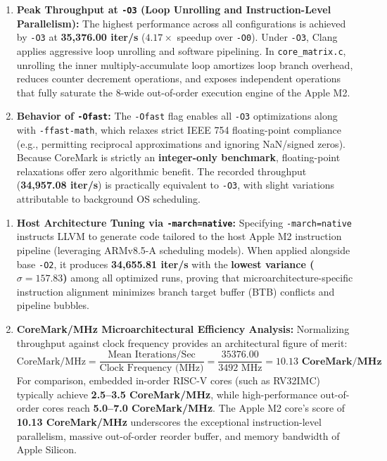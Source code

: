\documentclass[11pt,a4paper]{article}
\begin{document}
\begin{enumerate}[leftmargin=1.4em]
    \item \textbf{Peak Throughput at \texttt{-O3} (Loop Unrolling and Instruction-Level Parallelism):}
    The highest performance across all configurations is achieved by \texttt{-O3} at \textbf{35,376.00 iter/s} ($4.17\times$ speedup over \texttt{-O0}). Under \texttt{-O3}, Clang applies aggressive loop unrolling and software pipelining. In \texttt{core\_matrix.c}, unrolling the inner multiply-accumulate loop amortizes loop branch overhead, reduces counter decrement operations, and exposes independent operations that fully saturate the 8-wide out-of-order execution engine of the Apple M2.

    \item \textbf{Behavior of \texttt{-Ofast}:}
    The \texttt{-Ofast} flag enables all \texttt{-O3} optimizations along with \texttt{-ffast-math}, which relaxes strict IEEE 754 floating-point compliance (e.g., permitting reciprocal approximations and ignoring NaN/signed zeros). Because CoreMark is strictly an \textbf{integer-only benchmark}, floating-point relaxations offer zero algorithmic benefit. The recorded throughput (\textbf{34,957.08 iter/s}) is practically equivalent to \texttt{-O3}, with slight variations attributable to background OS scheduling.
\end{enumerate}

\clearpage
\begin{enumerate}[leftmargin=1.4em, start=6]
    \item \textbf{Host Architecture Tuning via \texttt{-march=native}:}
    Specifying \texttt{-march=native} instructs LLVM to generate code tailored to the host Apple M2 instruction pipeline (leveraging ARMv8.5-A scheduling models). When applied alongside base \texttt{-O2}, it produces \textbf{34,655.81 iter/s} with the \textbf{lowest variance ($\sigma = 157.83$)} among all optimized runs, proving that microarchitecture-specific instruction alignment minimizes branch target buffer (BTB) conflicts and pipeline bubbles.

    \item \textbf{CoreMark/MHz Microarchitectural Efficiency Analysis:}
    Normalizing throughput against clock frequency provides an architectural figure of merit:
    \begin{equation}
        \text{CoreMark/MHz} = \frac{\text{Mean Iterations/Sec}}{\text{Clock Frequency (MHz)}} = \frac{35376.00}{3492\text{ MHz}} = \mathbf{10.13\text{ CoreMark/MHz}}
    \end{equation}
    For comparison, embedded in-order RISC-V cores (such as RV32IMC) typically achieve \textbf{2.5--3.5 CoreMark/MHz}, while high-performance out-of-order cores reach \textbf{5.0--7.0 CoreMark/MHz}. The Apple M2 core's score of \textbf{10.13 CoreMark/MHz} underscores the exceptional instruction-level parallelism, massive out-of-order reorder buffer, and memory bandwidth of Apple Silicon.
\end{enumerate}
\end{document}
